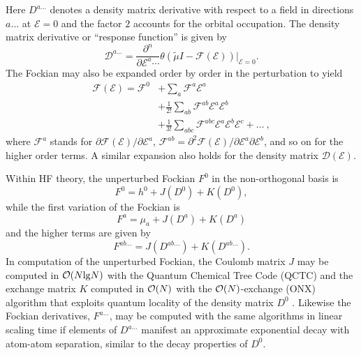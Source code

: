 \documentclass[prl,twocolumn,showpacs,twocolumngrid,superbib]{revtex4}
\def\F{\mathcal{F}}
\def\D{\mathcal{D}}
\def\E{\mathcal{E}}
\begin{document}
Here $D^{a\ldots}$ denotes a density matrix derivative with respect to a field in directions $a\ldots$ 
at $\mathcal{E} = 0$ and the factor $2$ accounts for the orbital occupation. 
The  density matrix derivative or ``response function'' is given by 
\begin{equation}
 \displaystyle\D^{a\ldots}=
 \frac{\partial^n}{\partial\E^{a}\cdots}\theta(\tilde{\mu}I-
 \F(\E))\bigg|_{\E=0} \label{DDeriv1}.
\end{equation}
 The Fockian may also be expanded order by order in the perturbation to yield
\begin{equation}\label{FockianTaylor}
  \begin{split}
    \F(\E)=\F^{0} & +\sum_a \F^{a}\E^{a}\\
    &+\frac{1}{2!}\sum_{ab} \F^{ab}\E^{a}\E^{b}\\
    &+\frac{1}{3!}\sum_{abc} \F^{abc}\E^{a}\E^{b}\E^{c}+\dots ~,
  \end{split}
\end{equation}
where $\F^{a}$ stands for $\partial\F(\E)/\partial\E^{a}$,
$\F^{ab}=\partial^2\F(\E)/\partial\E^{a}\partial\E^{b}$,
and so on for the higher order terms.
A similar expansion also holds for the density matrix $\D(\E)$.

Within HF theory, the unperturbed Fockian $F^0$ in the non-orthogonal basis is 
\begin{equation}
F^0=h^0+J(D^0)+K(D^0), \label{fockian0}
\end{equation}
while the first variation of the Fockian is 
\begin{equation}
F^a=\mu_a+J(D^a)+K(D^a)
\end{equation}
and the higher terms are given by 
\begin{equation}
F^{ab\ldots}=J(D^{ab\ldots})+K(D^{ab\ldots}). \label{fockianN}
\end{equation}
In computation of the unperturbed Fockian, the Coulomb matrix $J$ may be computed in ${\cal O}(N{\rm lg}N)$ 
with the Quantum Chemical Tree Code (QCTC) \cite{MChallacombe97} and the
exchange matrix $K$ computed in ${\cal O}(N)$ with the ${\cal O}(N)$-exchange  (ONX) algorithm 
that exploits quantum locality of the density matrix $D^0$ \cite{ESchwegler97}.
Likewise the Fockian derivatives, $F^{a\ldots}$, may be computed 
with the same algorithms in linear scaling time if elements of 
$D^{a\ldots}$ manifest an approximate exponential decay with atom-atom separation, 
similar to the decay properties of $D^0$. 
\end{document}
